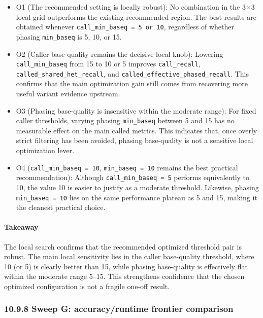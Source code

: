 \documentclass[
]{article}
\begin{document}
\begin{itemize}
\item
  O1 (The recommended setting is locally robust): No combination in the
  3×3 local grid outperforms the existing recommended region. The best
  results are obtained whenever \texttt{call\_min\_baseq\ =\ 5\ or\ 10},
  regardless of whether phasing \texttt{min\_baseq} is 5, 10, or 15.
\item
  O2 (Caller base-quality remains the decisive local knob): Lowering
  \texttt{call\_min\_baseq} from 15 to 10 or 5 improves
  \texttt{call\_recall}, \texttt{called\_shared\_het\_recall}, and
  \texttt{called\_effective\_phased\_recall}. This confirms that the
  main optimization gain still comes from recovering more useful variant
  evidence upstream.
\item
  O3 (Phasing base-quality is insensitive within the moderate range):
  For fixed caller thresholds, varying phasing \texttt{min\_baseq}
  between 5 and 15 has no measurable effect on the main called metrics.
  This indicates that, once overly strict filtering has been avoided,
  phasing base-quality is not a sensitive local optimization lever.
\item
  O4 (\texttt{call\_min\_baseq\ =\ 10}, \texttt{min\_baseq\ =\ 10}
  remains the best practical recommendation): Although
  \texttt{call\_min\_baseq\ =\ 5} performs equivalently to 10, the value
  10 is easier to justify as a moderate threshold. Likewise, phasing
  \texttt{min\_baseq\ =\ 10} lies on the same performance plateau as 5
  and 15, making it the cleanest practical choice.
\end{itemize}

\paragraph{Takeaway}\label{takeaway-13}

The local search confirms that the recommended optimized threshold pair
is robust. The main local sensitivity lies in the caller base-quality
threshold, where 10 (or 5) is clearly better than 15, while phasing
base-quality is effectively flat within the moderate range 5--15. This
strengthens confidence that the chosen optimized configuration is not a
fragile one-off result.

\subsubsection{10.9.8 Sweep G: accuracy/runtime frontier
comparison}\label{sweep-g-accuracyruntime-frontier-comparison}
\end{document}
